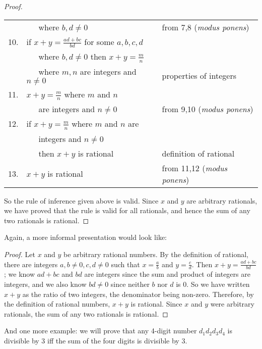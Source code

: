 \begin{proof}
\begin{center}
\begin{tabular}{r@{\ \ }l@{\qquad}l}
  & \ \ \ where $b,d \not=0$                                       & from 7,8 (\textit{modus ponens})\\
10.&if $x+y = \frac{ad+bc}{bd}$ for some $a,b,c,d$                 & \\
  & \ \ \  where $b,d \not=0$ then $x+y = \frac{m}{n}$             & \\
  & \ \ \  where $m,n$ are integers and $n\not= 0$                 & properties of integers\\
11.&$x+y = \frac{m}{n}$ where $m$ and $n$                          & \\
   & \ \ \ are integers and $n\not= 0$                             & from 9,10 (\textit{modus ponens})\\
12.&if  $x+y = \frac{m}{n}$ where $m$ and $n$ are                  & \\
   & \ \ \ integers and $n\not= 0$                                 & \\
   & \ \ \ then $x+y$ is rational                                  & definition of rational\\
13.&$x+y$ is rational                                              & from 11,12 (\textit{modus ponens})\\
\end{tabular}
\end{center}
So the rule of inference given above is valid.
Since $x$ and $y$ are arbitrary rationals, we have proved that the rule is valid for all
rationals, and hence the sum of any two rationals is rational.
\end{proof}

Again, a more informal presentation would look like: 
\begin{proof}
Let $x$ and $y$ be arbitrary rational
numbers.  By the definition of rational, there are integers $a,b\not=0,c,d\not=0$ such
that $x=\frac{a}{b}$ and $y=\frac{c}{d}$.  Then $x+y = \frac{ad+bc}{bd}$; we know 
$ad+bc$ and $bd$ are integers since the sum and product of integers are integers, and
we also know $bd\not=0$ since neither $b$ nor $d$ is 0.  So we have written
$x+y$ as the ratio of two integers, the denominator being non-zero.  Therefore, by
the definition of rational numbers, $x+y$ is rational.  Since $x$ and $y$ were arbitrary
rationals, the sum of any two rationals is rational. 
\end{proof}

\medskip

And one more example: we will prove that any 4-digit number $d_1d_2d_3d_4$ is 
divisible by 3 iff the sum of the four digits is divisible by 3.

